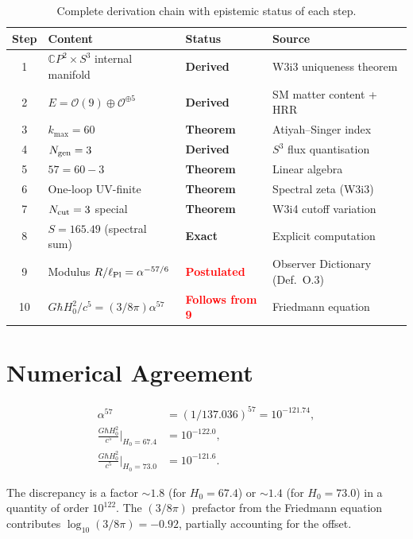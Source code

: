 \documentclass[11pt,a4paper]{article}
\newcommand{\CP}{\mathbb{C}P}
\newcommand{\Hzero}{H_0}
\newcommand{\alphafine}{\alpha}
\begin{document}
\begin{table}[h]
\centering
\small
\caption{Complete derivation chain with epistemic status of each step.}
\begin{tabular}{clll}
\toprule
\textbf{Step} & \textbf{Content} & \textbf{Status} & \textbf{Source} \\
\midrule
1 & $\CP^2 \times S^3$ internal manifold & \textbf{Derived}
  & W3i3 uniqueness theorem \\
2 & $E = \mathcal{O}(9) \oplus \mathcal{O}^{\oplus 5}$ & \textbf{Derived}
  & SM matter content + HRR \\
3 & $k_{\max} = 60$ & \textbf{Theorem}
  & Atiyah--Singer index \\
4 & $N_{\rm gen} = 3$ & \textbf{Derived}
  & $S^3$ flux quantisation \\
5 & $57 = 60 - 3$ & \textbf{Theorem}
  & Linear algebra \\
6 & One-loop UV-finite & \textbf{Theorem}
  & Spectral zeta (W3i3) \\
7 & $N_{\rm cut} = 3$ special & \textbf{Theorem}
  & W3i4 cutoff variation \\
8 & $S = 165.49$ (spectral sum) & \textbf{Exact}
  & Explicit computation \\
9 & Modulus $R/\ell_{\rm Pl} = \alphafine^{-57/6}$ &
  \textcolor{red}{\textbf{Postulated}}
  & Observer Dictionary (Def.~O.3) \\
10 & $G\hbar\Hzero^2/c^5 = (3/8\pi)\alphafine^{57}$ &
  \textcolor{red}{\textbf{Follows from 9}}
  & Friedmann equation \\
\bottomrule
\end{tabular}
\end{table}

\section{Numerical Agreement}
\label{sec:numerics}

\begin{align}
\alphafine^{57} &= (1/137.036)^{57} = 10^{-121.74}, \\[4pt]
\frac{G\hbar\Hzero^2}{c^5}\bigg|_{H_0 = 67.4} &= 10^{-122.0}, \\[4pt]
\frac{G\hbar\Hzero^2}{c^5}\bigg|_{H_0 = 73.0} &= 10^{-121.6}.
\end{align}

The discrepancy is a factor $\sim 1.8$ (for $H_0 = 67.4$) or
$\sim 1.4$ (for $H_0 = 73.0$) in a quantity of order $10^{122}$.
The $(3/8\pi)$ prefactor from the Friedmann equation contributes
$\log_{10}(3/8\pi) = -0.92$, partially accounting for the offset.
\end{document}
